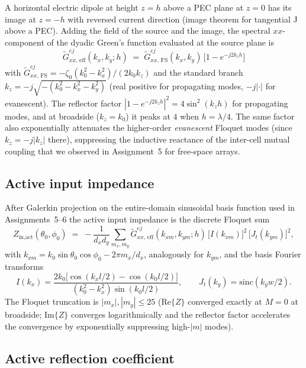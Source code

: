 \documentclass{article}
\begin{document}
A horizontal electric dipole at height $z = h$ above a PEC plane at $z = 0$ has its image at $z = -h$ with reversed current direction (image theorem for tangential J above a PEC). Adding the field of the source and the image, the spectral $xx$-component of the dyadic Green's function evaluated at the source plane is
\begin{equation}\label{eq:Geff}
\boxed{\;\widetilde{G}^{ej}_{xx,\,\text{eff}}(k_x,k_y;h) \;=\; \widetilde{G}^{ej}_{xx,\,\text{FS}}(k_x,k_y)\,\bigl[1 - e^{-j 2 k_z h}\bigr]\;}
\end{equation}
with $\widetilde{G}^{ej}_{xx,\,\text{FS}} = -\zeta_0(k_0^2-k_x^2)/(2k_0 k_z)$ and the standard branch $k_z = -j\sqrt{-(k_0^2-k_x^2-k_y^2)}$ (real positive for propagating modes, $-j|\cdot|$ for evanescent). The reflector factor $|1 - e^{-j 2 k_z h}|^2 = 4\sin^2(k_z h)$ for propagating modes, and at broadside ($k_z = k_0$) it peaks at $4$ when $h = \lambda/4$. The same factor also exponentially attenuates the higher-order \emph{evanescent} Floquet modes (since $k_z = -j|k_z|$ there), suppressing the inductive reactance of the inter-cell mutual coupling that we observed in Assignment~5 for free-space arrays.

\subsection{Active input impedance}

After Galerkin projection on the entire-domain sinusoidal basis function used in Assignments~5--6 the active input impedance is the discrete Floquet sum
\begin{equation}\label{eq:Zact}
Z_{\text{in,act}}(\theta_0,\phi_0) \;=\; -\frac{1}{d_x d_y}\sum_{m_x,m_y}\widetilde{G}^{ej}_{xx,\,\text{eff}}(k_{xm},k_{ym};h)\,\bigl[I(k_{xm})\bigr]^2\,\bigl[J_t(k_{ym})\bigr]^2,
\end{equation}
with $k_{xm} = k_0\sin\theta_0\cos\phi_0 - 2\pi m_x/d_x$, analogously for $k_{ym}$, and the basis Fourier transforms
\begin{equation}\label{eq:basisFT}
I(k_x) = \frac{2k_0\big[\cos(k_xl/2) - \cos(k_0l/2)\big]}{(k_0^2-k_x^2)\sin(k_0l/2)},\qquad J_t(k_y) = \mathrm{sinc}(k_yw/2).
\end{equation}
The Floquet truncation is $|m_x|,|m_y|\leq 25$ (Re$\{Z\}$ converged exactly at $M=0$ at broadside; Im$\{Z\}$ converges logarithmically and the reflector factor accelerates the convergence by exponentially suppressing high-$|m|$ modes).

\subsection{Active reflection coefficient}
\end{document}
